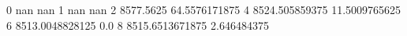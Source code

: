 0 nan nan
1 nan nan
2 8577.5625 64.5576171875
4 8524.505859375 11.5009765625
6 8513.0048828125 0.0
8 8515.6513671875 2.646484375
